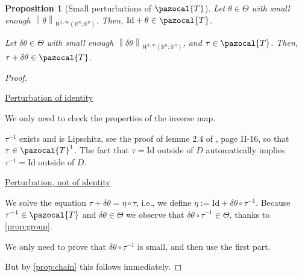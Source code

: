 \documentclass[english,a4paper,9pt,oneside]{scrbook}	%
\theoremstyle{break}
\newtheorem{prop}[equation]{Proposition}
\newenvironment{mproof}[1][\proofname]{%
  \begin{proof}[#1]$ $\par\nobreak\ignorespaces
}{%
  \end{proof}
}
\renewcommand*{\proofname}{Proof}
\theoremstyle{remark}
\newcommand{\mR}{\mathbb{R}}
\newcommand{\norm}[1]{\left\lVert#1\right\rVert}
\newcommand{\cT}{\pazocal{T}}
\newcommand{\id}{\text{Id}}
\newcommand{\te}{\theta}
\newcommand{\Te}{\Theta}
\begin{document}
\begin{appendices}
\begin{prop}[Small perturbations of $\cT$]
\label{prop:ptb_id}
Let $\te \in \Te$ with small enough $\norm{\te}_{W^{1,\infty}(\mR^n;\mR^n)}$. Then, $\id+\te\in \cT$.

Let $\delta \te \in \Te$ with small enough $\norm{\delta\te}_{W^{1,\infty}(\mR^n;\mR^n)}$, and $\tau \in \cT$. Then, $\tau + \delta \te\in \cT$.

\end{prop}
\begin{mproof}

\underline{Perturbation of identity}

We only need to check the properties of the inverse map.

$\tau^{-1}$ exists and is Lipschitz, see the proof of lemme 2.4 of \cite{murat}, page II-16, so that $\tau \in \cT^1$. The fact that $\tau = \id$ outside of $D$ automatically implies $\tau^{-1}=\id$ outside of $D$.

%
%

\underline{Perturbation, not of identity}

We solve the equation $\tau + \delta \te =\eta \circ \tau$, i.e., we define $\eta:=\id + \delta \te \circ \tau^{-1}$. Because $\tau^{-1} \in \cT$ and $\delta \te \in \Te$ we observe that $\delta \te \circ \tau^{-1} \in \Te $, thanks to \cref{prop:group}.

We only need to prove that $\delta \te \circ \tau^{-1}$ is small, and then use the first part. 

But by \cref{prop:chain} this follows immediately.
\end{mproof}


\end{appendices}
\end{document}
